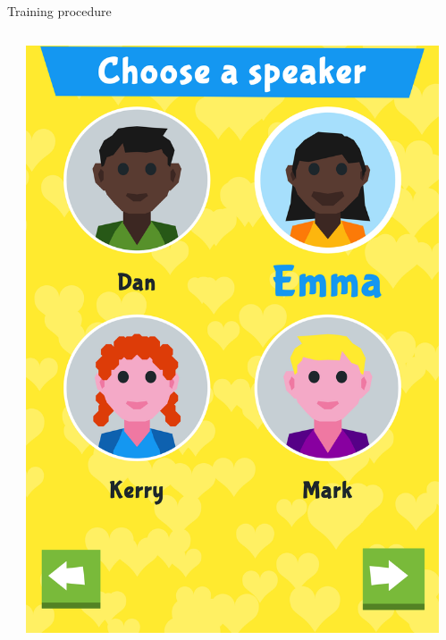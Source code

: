 \documentclass[final,xcolor={cmyk,hyperref}]{beamer}
\begin{document}
\begin{frame}[t]
\begin{columns}[t]
\begin{column}{0.45\linewidth}
\begin{block}{Training procedure}
\begin{columns}
\begin{column}{\screenshotwidth}
  \end{column}
  \begin{column}{\screenshotwidth}
    \includegraphics[width=\linewidth]{images/CALVin-screenshots/jpgs/choose_talker}
  \end{column}
  \begin{column}{\screenshotwidth}

\end{column}
\end{columns}
\end{block}
\end{column}
\end{columns}
\end{frame}
\end{document}
